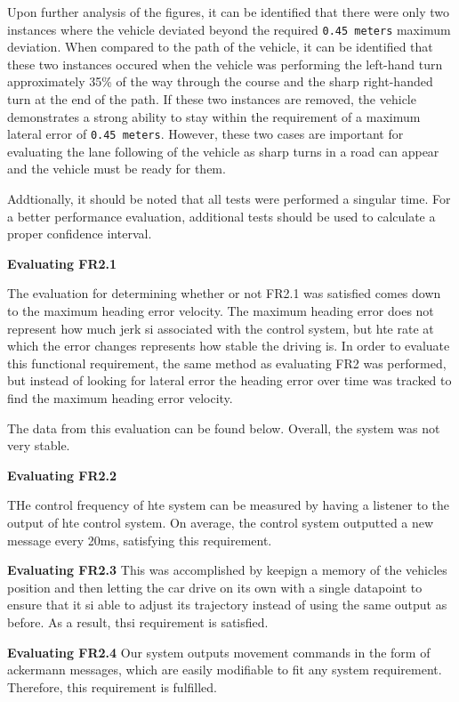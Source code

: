 \documentclass[titlepage]{article}
\begin{document}
{Upon further analysis of the figures, it can be identified that there were only two instances where the vehicle deviated beyond the required \texttt{0.45 meters} maximum deviation. When compared to the path of the vehicle, it can be identified that these two instances occured when the vehicle was performing the left-hand turn approximately 35\% of the way through the course and the sharp right-handed turn at the end of the path. If these two instances are removed, the vehicle demonstrates a strong ability to stay within the requirement of a maximum lateral error of \texttt{0.45 meters}. However, these two cases are important for evaluating the lane following of the vehicle as sharp turns in a road can appear and the vehicle must be ready for them.

Addtionally, it should be noted that all tests were performed a singular time. For a better performance evaluation, additional tests should be used to calculate a proper confidence interval.

\textbf{Evaluating FR2.1}

The evaluation for determining whether or not FR2.1 was satisfied comes down to the maximum heading error velocity. The maximum heading error does not represent how much jerk si associated with the control system, but hte rate at which the error changes represents how stable the driving is. In order to evaluate this functional requirement, the same method as evaluating FR2 was performed, but instead of looking for lateral error the heading error over time was tracked to find the maximum heading error velocity.

The data from this evaluation can be found below. Overall, the system was not very stable.

\textbf{Evaluating FR2.2}

THe control frequency of hte system can be measured by having a listener to the output of hte control system. On average, the control system outputted a new message every 20ms, satisfying this requirement.

\textbf{Evaluating FR2.3}
This was accomplished by keepign a memory of the vehicles position and then letting the car drive on its own with a single datapoint to ensure that it si able to adjust its trajectory instead of using the same output as before. As a result, thsi requirement is satisfied.

\textbf{Evaluating FR2.4}
Our system outputs movement commands in the form of ackermann messages, which are easily modifiable to fit any system requirement. Therefore, this requirement is fulfilled.


}
\end{document}
